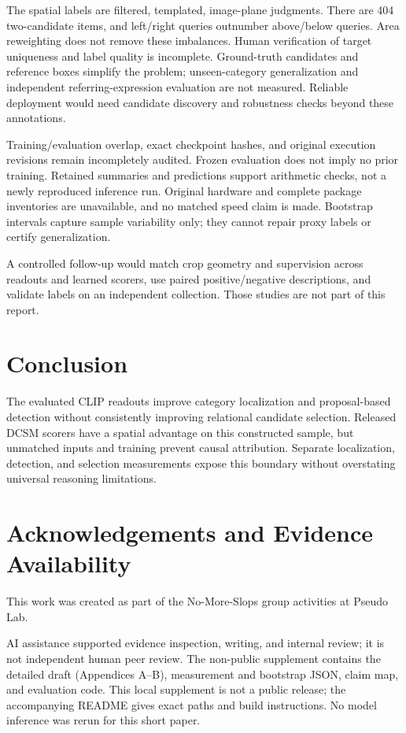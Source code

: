 \documentclass[10pt,twocolumn,letterpaper]{article}
\begin{document}
The spatial labels are filtered, templated, image-plane judgments. There
are 404 two-candidate items, and left/right queries outnumber
above/below queries. Area reweighting does not remove these imbalances.
Human verification of target uniqueness and label quality is incomplete.
Ground-truth candidates and reference boxes simplify the problem;
unseen-category generalization and independent referring-expression
evaluation are not measured. Reliable deployment would need candidate
discovery and robustness checks beyond these annotations.

Training/evaluation overlap, exact checkpoint hashes, and original
execution revisions remain incompletely audited. Frozen evaluation does
not imply no prior training. Retained summaries and predictions support
arithmetic checks, not a newly reproduced inference run. Original
hardware and complete package inventories are unavailable, and no
matched speed claim is made. Bootstrap intervals capture sample
variability only; they cannot repair proxy labels or certify
generalization.

A controlled follow-up would match crop geometry and supervision across
readouts and learned scorers, use paired positive/negative descriptions,
and validate labels on an independent collection. Those studies are not
part of this report.

\section{Conclusion}\label{conclusion}

The evaluated CLIP readouts improve category localization and
proposal-based detection without consistently improving relational
candidate selection. Released DCSM scorers have a spatial advantage on
this constructed sample, but unmatched inputs and training prevent
causal attribution. Separate localization, detection, and selection
measurements expose this boundary without overstating universal
reasoning limitations.

\section{Acknowledgements and Evidence
Availability}\label{acknowledgements-and-evidence-availability}

This work was created as part of the No-More-Slops group activities at
Pseudo Lab.

AI assistance supported evidence inspection, writing, and internal
review; it is not independent human peer review. The non-public
supplement contains the detailed draft (Appendices A--B), measurement
and bootstrap JSON, claim map, and evaluation code. This local
supplement is not a public release; the accompanying README gives exact
paths and build instructions. No model inference was rerun for this
short paper.

\label{main-text-end}
\clearpage
\nobalance


\end{document}

